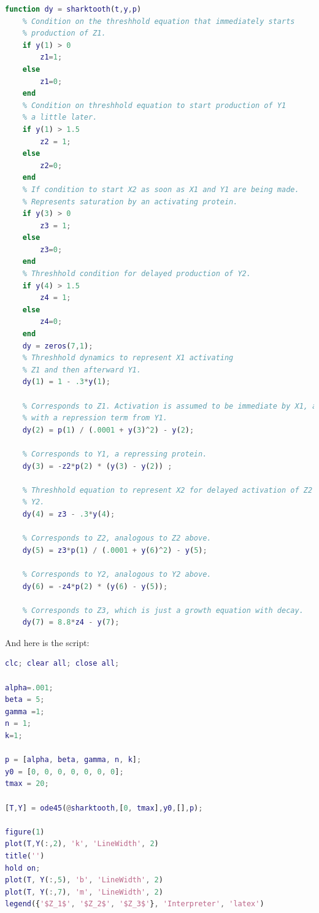 \documentclass{article}
\begin{document}
\begin{lstlisting}[language=Matlab]
function dy = sharktooth(t,y,p)
    % Condition on the threshhold equation that immediately starts 
    % production of Z1.
    if y(1) > 0
        z1=1;
    else
        z1=0;
    end
    % Condition on threshhold equation to start production of Y1 
    % a little later.
    if y(1) > 1.5
        z2 = 1;
    else
        z2=0;
    end
    % If condition to start X2 as soon as X1 and Y1 are being made.
    % Represents saturation by an activating protein.
    if y(3) > 0
        z3 = 1;
    else 
        z3=0;
    end
    % Threshhold condition for delayed production of Y2.
    if y(4) > 1.5
        z4 = 1;
    else
        z4=0;
    end
    dy = zeros(7,1);
    % Threshhold dynamics to represent X1 activating 
    % Z1 and then afterward Y1.
    dy(1) = 1 - .3*y(1);
    
    % Corresponds to Z1. Activation is assumed to be immediate by X1, along
    % with a repression term from Y1.
    dy(2) = p(1) / (.0001 + y(3)^2) - y(2);
    
    % Corresponds to Y1, a repressing protein.
    dy(3) = -z2*p(2) * (y(3) - y(2)) ;
    
    % Threshhold equation to represent X2 for delayed activation of Z2 and
    % Y2.
    dy(4) = z3 - .3*y(4);
    
    % Corresponds to Z2, analogous to Z2 above.
    dy(5) = z3*p(1) / (.0001 + y(6)^2) - y(5);
    
    % Corresponds to Y2, analogous to Y2 above.
    dy(6) = -z4*p(2) * (y(6) - y(5));
    
    % Corresponds to Z3, which is just a growth equation with decay.
    dy(7) = 8.8*z4 - y(7);
\end{lstlisting}
And here is the script:
\begin{lstlisting}[language=Matlab]
clc; clear all; close all;

alpha=.001;
beta = 5;
gamma =1;
n = 1;
k=1;

p = [alpha, beta, gamma, n, k];
y0 = [0, 0, 0, 0, 0, 0, 0];
tmax = 20;

[T,Y] = ode45(@sharktooth,[0, tmax],y0,[],p);

figure(1)
plot(T,Y(:,2), 'k', 'LineWidth', 2)
title('')
hold on;
plot(T, Y(:,5), 'b', 'LineWidth', 2)
plot(T, Y(:,7), 'm', 'LineWidth', 2)
legend({'$Z_1$', '$Z_2$', '$Z_3$'}, 'Interpreter', 'latex')
\end{lstlisting}
 
\end{document}
